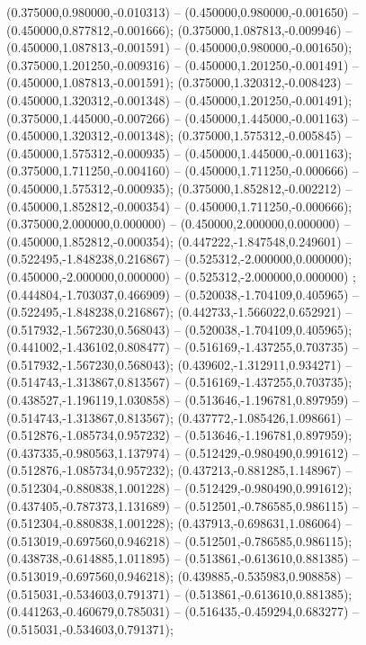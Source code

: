  (0.375000,0.980000,-0.010313) -- (0.450000,0.980000,-0.001650) -- (0.450000,0.877812,-0.001666);
 (0.375000,1.087813,-0.009946) -- (0.450000,1.087813,-0.001591) -- (0.450000,0.980000,-0.001650);
 (0.375000,1.201250,-0.009316) -- (0.450000,1.201250,-0.001491) -- (0.450000,1.087813,-0.001591);
 (0.375000,1.320312,-0.008423) -- (0.450000,1.320312,-0.001348) -- (0.450000,1.201250,-0.001491);
 (0.375000,1.445000,-0.007266) -- (0.450000,1.445000,-0.001163) -- (0.450000,1.320312,-0.001348);
 (0.375000,1.575312,-0.005845) -- (0.450000,1.575312,-0.000935) -- (0.450000,1.445000,-0.001163);
 (0.375000,1.711250,-0.004160) -- (0.450000,1.711250,-0.000666) -- (0.450000,1.575312,-0.000935);
 (0.375000,1.852812,-0.002212) -- (0.450000,1.852812,-0.000354) -- (0.450000,1.711250,-0.000666);
 (0.375000,2.000000,0.000000) -- (0.450000,2.000000,0.000000) -- (0.450000,1.852812,-0.000354);
 (0.447222,-1.847548,0.249601) -- (0.522495,-1.848238,0.216867) -- (0.525312,-2.000000,0.000000);
 (0.450000,-2.000000,0.000000) -- (0.525312,-2.000000,0.000000) ;
 (0.444804,-1.703037,0.466909) -- (0.520038,-1.704109,0.405965) -- (0.522495,-1.848238,0.216867);
 (0.442733,-1.566022,0.652921) -- (0.517932,-1.567230,0.568043) -- (0.520038,-1.704109,0.405965);
 (0.441002,-1.436102,0.808477) -- (0.516169,-1.437255,0.703735) -- (0.517932,-1.567230,0.568043);
 (0.439602,-1.312911,0.934271) -- (0.514743,-1.313867,0.813567) -- (0.516169,-1.437255,0.703735);
 (0.438527,-1.196119,1.030858) -- (0.513646,-1.196781,0.897959) -- (0.514743,-1.313867,0.813567);
 (0.437772,-1.085426,1.098661) -- (0.512876,-1.085734,0.957232) -- (0.513646,-1.196781,0.897959);
 (0.437335,-0.980563,1.137974) -- (0.512429,-0.980490,0.991612) -- (0.512876,-1.085734,0.957232);
 (0.437213,-0.881285,1.148967) -- (0.512304,-0.880838,1.001228) -- (0.512429,-0.980490,0.991612);
 (0.437405,-0.787373,1.131689) -- (0.512501,-0.786585,0.986115) -- (0.512304,-0.880838,1.001228);
 (0.437913,-0.698631,1.086064) -- (0.513019,-0.697560,0.946218) -- (0.512501,-0.786585,0.986115);
 (0.438738,-0.614885,1.011895) -- (0.513861,-0.613610,0.881385) -- (0.513019,-0.697560,0.946218);
 (0.439885,-0.535983,0.908858) -- (0.515031,-0.534603,0.791371) -- (0.513861,-0.613610,0.881385);
 (0.441263,-0.460679,0.785031) -- (0.516435,-0.459294,0.683277) -- (0.515031,-0.534603,0.791371);
